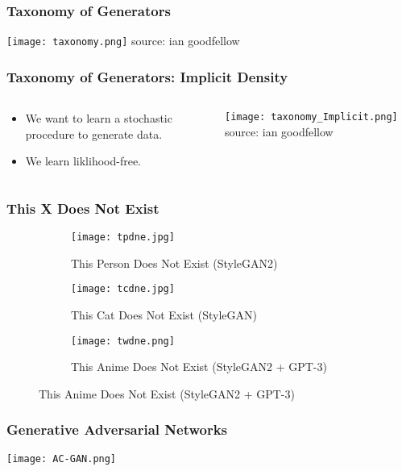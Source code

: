 \begin{frame}
    \frametitle{Taxonomy of Generators}
    \texttt{[image: taxonomy.png]}
    \null\hfill \tiny{source: ian goodfellow}
\end{frame}

\begin{frame}
    \frametitle{Taxonomy of Generators: Implicit Density}
    \begin{columns}
        \begin{column}{0.48\paperwidth}
            \begin{itemize}
                \item We want to learn a stochastic procedure to generate data. 
                \item We learn liklihood-free.
            \end{itemize}
        \end{column}
        \begin{column}{0.48\paperwidth}
            \texttt{[image: taxonomy\_Implicit.png]}
            \null\hfill \tiny{source: ian goodfellow}
        \end{column}
    \end{columns}
\end{frame}

\begin{frame}
    \frametitle{This X Does Not Exist}
    \vspace{-1em}
    \begin{figure}
        \begin{subfigure}{0.25\textwidth}
            \texttt{[image: tpdne.jpg]}
            \caption{This Person Does Not Exist (StyleGAN2)}
        \end{subfigure}
        \begin{subfigure}{0.25\textwidth}
            \texttt{[image: tcdne.jpg]}
            \caption{This Cat Does Not Exist (StyleGAN)}
        \end{subfigure}
        \begin{subfigure}{0.5\textwidth}
            \texttt{[image: twdne.png]}
            \caption{This Anime Does Not Exist (StyleGAN2 + GPT-3)}
        \end{subfigure}
    \end{figure}
\end{frame}

\begin{frame}
    \frametitle{Generative Adversarial Networks}
    \texttt{[image: AC-GAN.png]}
\end{frame}

